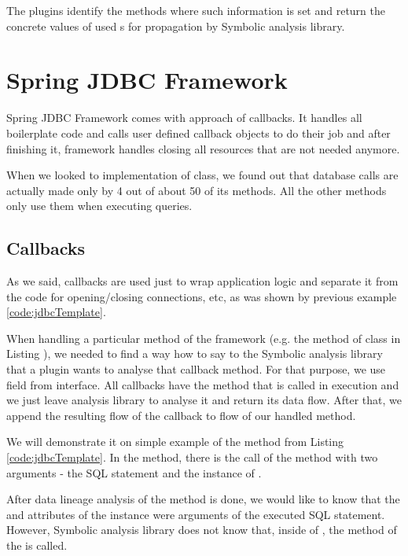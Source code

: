 The plugins identify the methods where such information is set and return
the concrete values of used s for propagation by Symbolic analysis library.



\section{Spring JDBC Framework}

Spring JDBC Framework comes with approach of callbacks. It handles
all boilerplate code and calls user defined callback objects to do their job
and after finishing it, framework handles closing all resources that are not needed anymore.

When we looked to implementation of  class, we found out
that database calls are actually made only by 4 out of about 50 of its methods.
All the other methods only use them when executing queries.



\subsection{Callbacks}

As we said, callbacks are used just to wrap application logic and
separate it from the code for opening/closing connections, etc,
as was shown by previous example \ref{code:jdbcTemplate}.

When handling a particular method of the framework (e.g. the 
method of  class in Listing ),
we needed to find a way how to say to the Symbolic analysis library that a plugin wants to
analyse that callback method. For that purpose, we use
field  from interface. 
All callbacks have the method that is called in execution
and we just leave analysis library to analyse it and return
its data flow. After that, we append the resulting flow of the callback
to flow of our handled method.

We will demonstrate it on simple example of the  method from Listing \ref{code:jdbcTemplate}.
In the method, there is the call of the  method
with two arguments - the SQL statement and the instance of .

After data lineage analysis of the  method is done, we would like to know
that the  and  attributes of the  instance
were arguments of the executed SQL statement.
However, Symbolic analysis library does not know that, inside of ,
the  method of the  is called.

